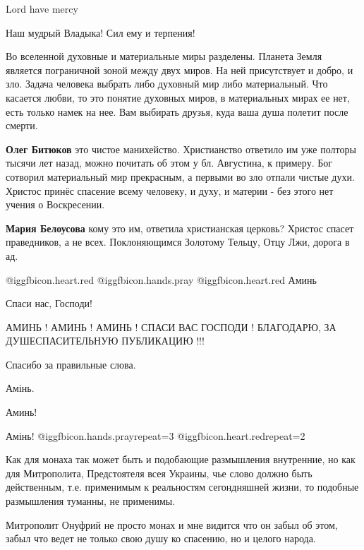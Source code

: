 \begin{itemize}
Lord have mercy

Наш мудрый
Владыка! Сил ему и терпения!


Во вселенной духовные и материальные миры разделены. Планета Земля является
пограничной зоной между двух миров. На ней присутствует и добро, и зло. Задача
человека выбрать либо духовный мир либо материальный. Что касается любви, то
это понятие духовных миров, в материальных мирах ее нет, есть только намек на
нее. Вам выбирать друзья, куда ваша душа полетит после смерти.

\begin{itemize} %
\textbf{Олег Битюков} это чистое манихейство. Христианство ответило им уже
полторы тысячи лет назад, можно почитать об этом у бл. Августина, к примеру.
Бог сотворил материальный мир прекрасным, а первыми во зло отпали чистые духи.
Христос принёс спасение всему человеку, и духу, и материи - без этого нет
учения о Воскресении.

\textbf{Мария Белоусова} кому это им, ответила христианская церковь? Христос спасет праведников, а не всех. Поклоняющимся Золотому Тельцу, Отцу Лжи, дорога в ад.
\end{itemize} %

@igg{fbicon.heart.red} @igg{fbicon.hands.pray} @igg{fbicon.heart.red} Аминь

Спаси нас, Господи!

АМИНЬ ! АМИНЬ ! АМИНЬ !
СПАСИ ВАС ГОСПОДИ !
БЛАГОДАРЮ, ЗА ДУШЕСПАСИТЕЛЬНУЮ ПУБЛИКАЦИЮ !!!

Спасибо за правильные слова.

Амінь.

Аминь!

Амінь! @igg{fbicon.hands.pray}{repeat=3}  @igg{fbicon.heart.red}{repeat=2}


Как для монаха так может быть и подобающие размышления внутренние, но как для
Митрополита, Предстоятеля всея Украины, чье слово должно быть действенным, т.е.
применимым к реальностям сегондняшней жизни, то подобные размышления туманны,
не применимы.

Митрополит Онуфрий не просто монах и мне видится что он забыл об этом, забыл
что ведет не только свою душу ко спасению, но и целого народа.


\end{itemize}
